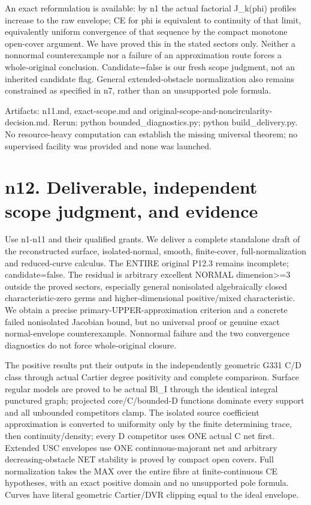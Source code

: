 \documentclass[11pt]{article}
\begin{document}
An exact reformulation is available: by n1 the actual factorial J\_k(phi) profiles increase to the raw envelope; CE for phi is equivalent to continuity of that limit, equivalently uniform convergence of that sequence by the compact monotone open-cover argument. We have proved this in the stated sectors only. Neither a nonnormal counterexample nor a failure of an approximation route forces a whole-original conclusion. Candidate=false is our fresh scope judgment, not an inherited candidate flag. General extended-obstacle normalization also remains constrained as specified in n7, rather than an unsupported pole formula.

Artifacts: n11.md, exact-scope.md and original-scope-and-noncircularity-decision.md. Rerun: python bounded\_diagnostics.py; python build\_delivery.py. No resource-heavy computation can establish the missing universal theorem; no supervised facility was provided and none was launched.


\section*{n12. Deliverable, independent scope judgment, and evidence}

Use n1-n11 and their qualified grants. We deliver a complete standalone draft of the reconstructed surface, isolated-normal, smooth, finite-cover, full-normalization and reduced-curve calculus. The ENTIRE original P12.3 remains incomplete; candidate=false. The residual is arbitrary excellent NORMAL dimension>=3 outside the proved sectors, especially general nonisolated algebraically closed characteristic-zero germs and higher-dimensional positive/mixed characteristic. We obtain a precise primary-UPPER-approximation criterion and a concrete failed nonisolated Jacobian bound, but no universal proof or genuine exact normal-envelope counterexample. Nonnormal failure and the two convergence diagnostics do not force whole-original closure.

The positive results put their outputs in the independently geometric G331 C/D class through actual Cartier degree positivity and complete comparison. Surface regular models are proved to be actual Bl\_I through the identical integral punctured graph; projected core/C/bounded-D functions dominate every support and all unbounded competitors clamp. The isolated source coefficient approximation is converted to uniformity only by the finite determining trace, then continuity/density; every D competitor uses ONE actual C net first. Extended USC envelopes use ONE continuous-majorant net and arbitrary decreasing-obstacle NET stability is proved by compact open covers. Full normalization takes the MAX over the entire fibre at finite-continuous CE hypotheses, with an exact positive domain and no unsupported pole formula. Curves have literal geometric Cartier/DVR clipping equal to the ideal envelope.
\end{document}
